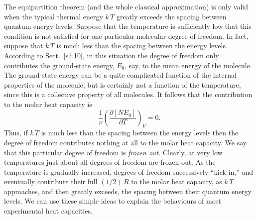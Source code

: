 The equipartition theorem (and the whole classical approximation) is only valid
when the typical thermal energy $k\,T$ greatly exceeds the spacing between quantum
energy levels. Suppose that the temperature is sufficiently low that this 
condition is not satisfied for one particular molecular degree of freedom. 
In fact, suppose that $k\,T$ is much less than the spacing between
the  energy levels.
According to Sect.~\ref{s7.10}, in this situation the degree of freedom only contributes
the ground-state energy, $E_0$, say, to the mean energy of the molecule. The 
ground-state energy can be  a quite complicated 
function of the  internal properties of  the
molecule, but  is certainly not a function of the temperature, since this is
a collective property of all molecules. It follows that the contribution to
the molar heat capacity is
\begin{equation}
\frac{1}{\nu}\left(
\frac{\partial [N E_0]}{\partial T}\right)_V = 0.
\end{equation}
Thus, if $k\,T$ is much less than the spacing between the energy levels then
the degree of 
freedom contributes nothing at all 
to the molar heat capacity. We say that this particular
degree of freedom is {\em frozen out}. Clearly, at very low temperatures just about
all degrees of freedom are frozen out. As the temperature is gradually increased,
degrees of freedom  successively 
``kick in,'' and eventually contribute their full $(1/2)\,R$ to
the molar heat capacity, as $k\,T$ approaches, and then greatly exceeds, the spacing
between their
quantum energy levels. We can use these simple ideas to explain the behaviours
 of  most 
experimental  heat capacities.


